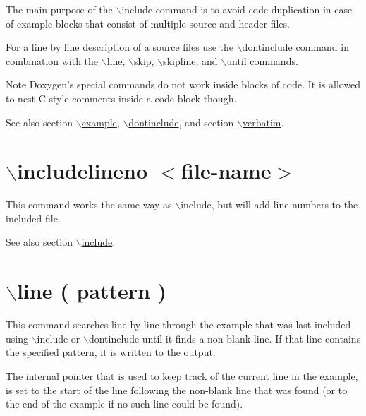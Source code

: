 The main purpose of the $\backslash$include command is to avoid code duplication in case of example blocks that consist of multiple source and header files.

For a line by line description of a source files use the \hyperlink{commands_cmddontinclude}{$\backslash$dontinclude} command in combination with the \hyperlink{commands_cmdline}{$\backslash$line}, \hyperlink{commands_cmdskip}{$\backslash$skip}, \hyperlink{commands_cmdskipline}{$\backslash$skipline}, and $\backslash$until commands.

\begin{DoxyNote}{Note}
Doxygen's special commands do not work inside blocks of code. It is allowed to nest C-\/style comments inside a code block though.
\end{DoxyNote}
\begin{DoxySeeAlso}{See also}
section \hyperlink{commands_cmdexample}{$\backslash$example}, \hyperlink{commands_cmddontinclude}{$\backslash$dontinclude}, and section \hyperlink{commands_cmdverbatim}{$\backslash$verbatim}.
\end{DoxySeeAlso}


 \hypertarget{commands_cmdincludelineno}{}\section{$\backslash$includelineno $<$file-\/name$>$}\label{commands_cmdincludelineno}
 This command works the same way as $\backslash$include, but will add line numbers to the included file.

\begin{DoxySeeAlso}{See also}
section \hyperlink{commands_cmdinclude}{$\backslash$include}.
\end{DoxySeeAlso}


 \hypertarget{commands_cmdline}{}\section{$\backslash$line ( pattern )}\label{commands_cmdline}
 This command searches line by line through the example that was last included using $\backslash$include or $\backslash$dontinclude until it finds a non-\/blank line. If that line contains the specified pattern, it is written to the output.

The internal pointer that is used to keep track of the current line in the example, is set to the start of the line following the non-\/blank line that was found (or to the end of the example if no such line could be found).

